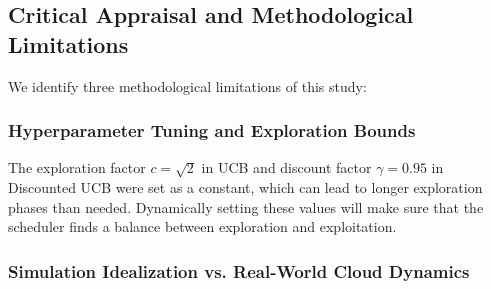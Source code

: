 
\subsection{Critical Appraisal and Methodological Limitations}
We identify three methodological limitations of this study:

\subsubsection{Hyperparameter Tuning and Exploration Bounds}
The exploration factor $c = \sqrt{2}$ in UCB and discount factor $\gamma = 0.95$ in Discounted UCB were set as a constant, which can lead to longer exploration phases than needed. Dynamically setting these values will make sure that the scheduler finds a balance between exploration and exploitation.

\subsubsection{Simulation Idealization vs. Real-World Cloud Dynamics}

